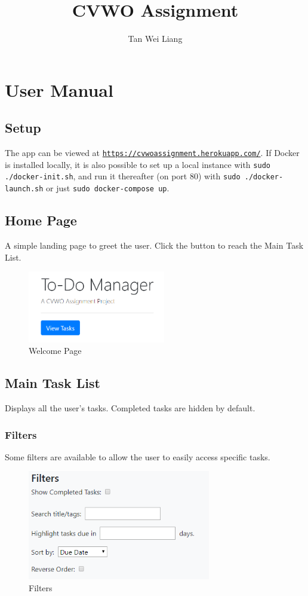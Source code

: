 \documentclass[12pt]{article}
\title{CVWO Assignment}
\author{Tan Wei Liang}
\begin{document}
  \section{User Manual}
    \subsection{Setup}
	The app can be viewed at \href{https://cvwoassignment.herokuapp.com/}{\texttt{https://cvwoassignment.herokuapp.com/}}. If Docker is installed locally, it is also possible to set up a local instance with \texttt{sudo ./docker-init.sh}, and run it thereafter (on port 80) with \texttt{sudo ./docker-launch.sh} or just \texttt{sudo docker-compose up}.
	\subsection{Home Page}
 	A simple landing page to greet the user. Click the button to reach the Main Task List.
	
   	\begin{figure}[h]
	  \includegraphics[width=6cm]{welcome.png}
	  \centering
	  \caption{Welcome Page}
	\end{figure}
	
    \subsection{Main Task List}
    Displays all the user's tasks. Completed tasks are hidden by default.
	  \subsubsection{Filters}
    	Some filters are available to allow the user to easily access specific tasks.
    	\begin{figure}[h]
		  \includegraphics[width=8cm]{filters.png}
		  \centering
		  \caption{Filters}
		\end{figure}
\end{document}

